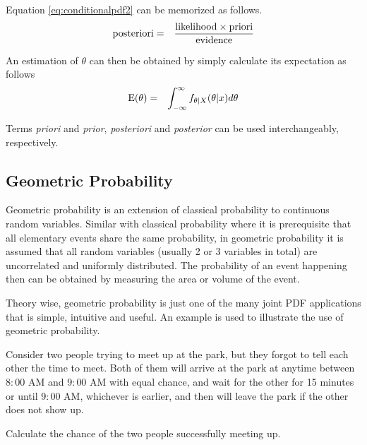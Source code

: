 Equation \eqref{eq:conditionalpdf2} can be memorized as follows.
\begin{eqnarray}
  \textup{posteriori} &=& \dfrac{\textup{likelihood}\times\textup{priori}}{\textup{evidence}} \nonumber
\end{eqnarray}

An estimation of $\theta$ can then be obtained by simply calculate its expectation as follows
\begin{eqnarray}
  \textup{E}(\theta) &=& \int_{-\infty}^{\infty} f_{\theta|X}(\theta|x) d\theta \nonumber
\end{eqnarray}

Terms \textit{priori} and \textit{prior}, \textit{posteriori} and \textit{posterior} can be used interchangeably, respectively.

\subsection{Geometric Probability}

Geometric probability is an extension of classical probability to continuous random variables. Similar with classical probability where it is prerequisite that all elementary events share the same probability, in geometric probability it is assumed that all random variables (usually 2 or 3 variables in total) are uncorrelated and uniformly distributed. The probability of an event happening then can be obtained by measuring the area or volume of the event.

Theory wise, geometric probability is just one of the many joint PDF applications that is simple, intuitive and useful. An example is used to illustrate the use of geometric probability.

\begin{shortbox}
Consider two people trying to meet up at the park, but they forgot to tell each other the time to meet. Both of them will arrive at the park at anytime between $8:00$ AM and $9:00$ AM with equal chance, and wait for the other for 15 minutes or until $9:00$ AM, whichever is earlier, and then will leave the park if the other does not show up.

Calculate the chance of the two people successfully meeting up.
\end{shortbox}

